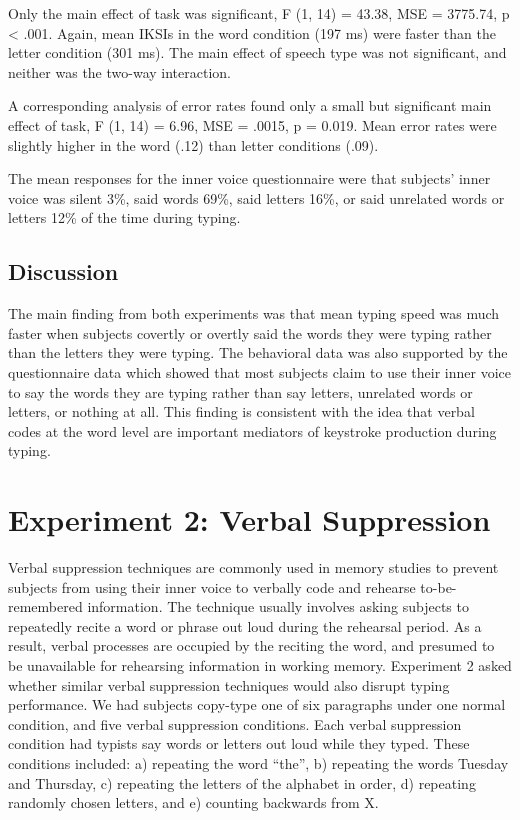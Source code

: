 \documentclass[,man,floatsintext]{apa6}
\begin{document}
Only the main effect of task was significant, F (1, 14) = 43.38, MSE = 3775.74, p \textless{} .001. Again, mean IKSIs in the word condition (197 ms) were faster than the letter condition (301 ms). The main effect of speech type was not significant, and neither was the two-way interaction.

A corresponding analysis of error rates found only a small but significant main effect of task, F (1, 14) = 6.96, MSE = .0015, p = 0.019. Mean error rates were slightly higher in the word (.12) than letter conditions (.09).

The mean responses for the inner voice questionnaire were that subjects' inner voice was silent 3\%, said words 69\%, said letters 16\%, or said unrelated words or letters 12\% of the time during typing.

\hypertarget{discussion}{%
\subsection{Discussion}\label{discussion}}

The main finding from both experiments was that mean typing speed was much faster when subjects covertly or overtly said the words they were typing rather than the letters they were typing. The behavioral data was also supported by the questionnaire data which showed that most subjects claim to use their inner voice to say the words they are typing rather than say letters, unrelated words or letters, or nothing at all. This finding is consistent with the idea that verbal codes at the word level are important mediators of keystroke production during typing.

\hypertarget{experiment-2-verbal-suppression}{%
\section{Experiment 2: Verbal Suppression}\label{experiment-2-verbal-suppression}}

Verbal suppression techniques are commonly used in memory studies to prevent subjects from using their inner voice to verbally code and rehearse to-be-remembered information. The technique usually involves asking subjects to repeatedly recite a word or phrase out loud during the rehearsal period. As a result, verbal processes are occupied by the reciting the word, and presumed to be unavailable for rehearsing information in working memory. Experiment 2 asked whether similar verbal suppression techniques would also disrupt typing performance. We had subjects copy-type one of six paragraphs under one normal condition, and five verbal suppression conditions. Each verbal suppression condition had typists say words or letters out loud while they typed. These conditions included: a) repeating the word \enquote{the}, b) repeating the words Tuesday and Thursday, c) repeating the letters of the alphabet in order, d) repeating randomly chosen letters, and e) counting backwards from X.
\end{document}
